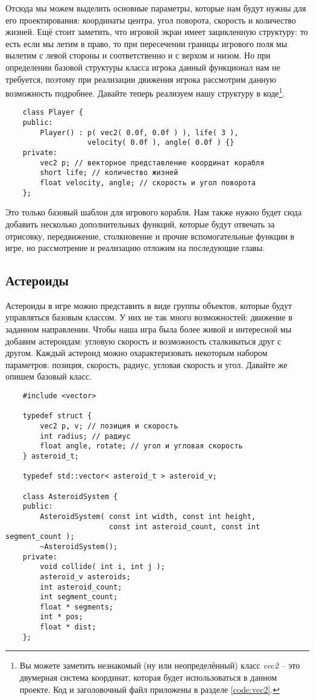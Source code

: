 Отсюда мы можем выделить основные параметры, которые нам будут нужны для его проектирования: координаты 
центра, угол поворота, скорость и количество жизней. Ещё стоит заметить, что игровой экран имеет зацикленную 
структуру: то есть если мы летим в право, то при пересечении границы игрового поля мы вылетим с левой стороны 
и соответственно и с верхом и низом. Но при определении базовой структуры класса игрока данный функционал 
нам не требуется, поэтому при реализации движения игрока рассмотрим данную возможность подробнее. Давайте 
теперь реализуем нашу структуру в коде\footnote{Вы можете заметить незнакомый (ну или неопределённый) класс 
\emph{vec2} -- это двумерная система координат, которая будет использоваться в данном проекте. Код и 
заголовочный файл приложены в разделе \ref{code:vec2}.}.
\begin{lstlisting}
    class Player {
    public:
        Player() : p( vec2( 0.0f, 0.0f ) ), life( 3 ), 
                   velocity( 0.0f ), angle( 0.0f ) {}
    private:
        vec2 p; // векторное представление координат корабля
        short life; // количество жизней
        float velocity, angle; // скорость и угол поворота
    };
\end{lstlisting}

Это только базовый шаблон для игрового корабля. Нам также нужно будет сюда добавить несколько дополнительных 
функций, которые будут отвечать за отрисовку, передвижение, столкновение и прочие вспомогательные функции 
в игре, но рассмотрение и реализацию отложим на последующие главы.

\subsection{Астероиды}
Астероиды в игре можно представить в виде группы объектов, которые будут управляться базовым классом. У них 
не так много возможностей: движение в заданном направлении. Чтобы наша игра была более живой и интересной мы 
добавим астероидам: угловую скорость и возможность сталкиваться друг с другом. Каждый астероид можно 
охарактеризовать некоторым набором параметров: позиция, скорость, радиус, угловая скорость и угол. Давайте 
же опишем базовый класс.
\begin{lstlisting}
    #include <vector>

    typedef struct {
        vec2 p, v; // позиция и скорость
        int radius; // радиус
        float angle, rotate; // угол и угловая скорость
    } asteroid_t;

    typedef std::vector< asteroid_t > asteroid_v; 

    class AsteroidSystem {
    public:
        AsteroidSystem( const int width, const int height, 
                        const int asteroid_count, const int segment_count );
        ~AsteroidSystem();
    private:
        void collide( int i, int j );
        asteroid_v asteroids;
        int asteroid_count;
        int segment_count;
        float * segments;
        int * pos;
        float * dist;
    };
\end{lstlisting}

